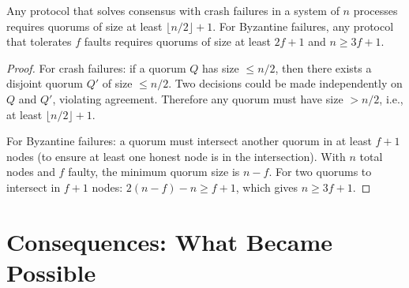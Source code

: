 \begin{theorem}
Any protocol that solves consensus with crash failures in a system of $n$ processes requires quorums of size at least $\lfloor n/2 \rfloor + 1$. For Byzantine failures, any protocol that tolerates $f$ faults requires quorums of size at least $2f+1$ and $n \ge 3f+1$.
\end{theorem}

\begin{proof}
For crash failures: if a quorum $Q$ has size $\le n/2$, then there exists a disjoint quorum $Q'$ of size $\le n/2$. Two decisions could be made independently on $Q$ and $Q'$, violating agreement. Therefore any quorum must have size $> n/2$, i.e., at least $\lfloor n/2 \rfloor + 1$.

For Byzantine failures: a quorum must intersect another quorum in at least $f+1$ nodes (to ensure at least one honest node is in the intersection). With $n$ total nodes and $f$ faulty, the minimum quorum size is $n - f$. For two quorums to intersect in $f+1$ nodes: $2(n - f) - n \ge f + 1$, which gives $n \ge 3f+1$.
\end{proof}

\section{Consequences: What Became Possible}
\label{sec:consensus:consequences}

